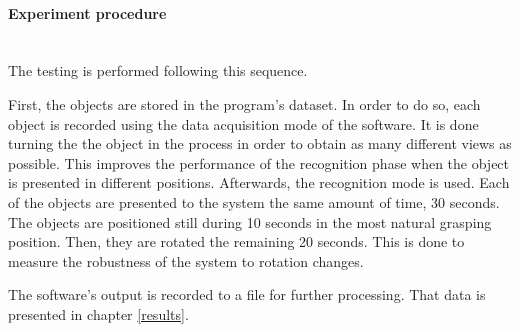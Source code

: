 

	\paragraph{Experiment procedure}\mbox{}\\

		The testing is performed following this sequence. 



		First, the objects are stored in the program's dataset. 
		In order to do so, each object is recorded using the data acquisition mode of the software. 
		It is done turning the the object in the process in order to obtain as many different views as possible. 
		This improves the performance of the recognition phase when the object is presented in different positions. 
		Afterwards, the recognition mode is used.
		Each of the objects are presented to the system the same amount of time, 30 seconds. 
		The objects are positioned still during 10 seconds in the most natural grasping position. 
		Then, they are rotated the remaining 20 seconds. 
		This is done to measure the robustness of the system to rotation changes. 

		The software's output is recorded to a file for further processing. 
		That data is presented in chapter \ref{results}.
		\\

